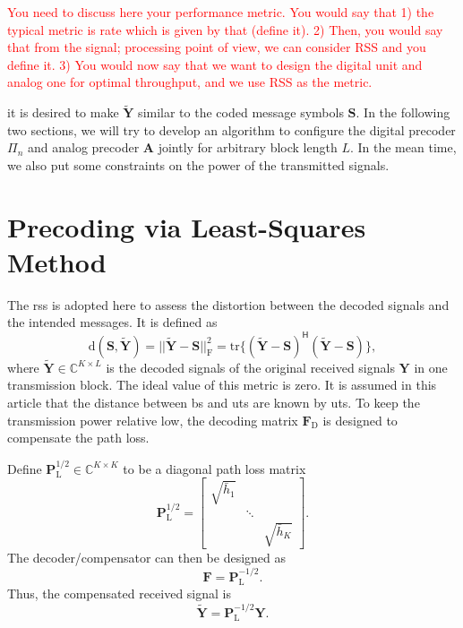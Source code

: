 \documentclass[12pt,draftclsnofoot,onecolumn,journal]{IEEEtran}
\newcommand{\cmt}[1]{\textcolor{red}{#1} }
\begin{document}
\cmt{You need to discuss here your performance metric. You would say that 1) the typical metric is rate which is given by that (define it). 2) Then, you would say that from the signal; processing point of view, we can consider RSS and you define it. 3) You would now say that we want to design the digital unit and analog one for optimal throughput, and we use RSS as the metric.}

  it is desired to make $\tilde{\mathbf Y}$ similar to the coded message symbols $\mathbf S$. In the following two sections, we will try to develop an algorithm to configure the digital precoder $\Pi_n$ and analog precoder $\mathbf A$ jointly for arbitrary block length $L$. In the mean time, we also put some constraints on the power of the transmitted signals.


\section{Precoding via Least-Squares Method}
The \ac{rss} is adopted here to assess the distortion between the decoded signals and the intended messages. It is defined as
\begin{equation}
\mathrm d(\mathbf S, \tilde{\mathbf Y})=||\tilde{\mathbf Y}-\mathbf S||_{\mathrm{F}}^2=\mathrm{tr}\{(\tilde{\mathbf Y}-\mathbf S)^{\mathsf H}(\tilde{\mathbf Y}-\mathbf S)\},
\label{eq:distancegeneral}
\end{equation}
where $\tilde{\mathbf Y}\in \mathbb C^{K\times L}$ is the decoded signals of the original received signals $\mathbf Y$ in one transmission block.
The ideal value of this metric is zero.
It is assumed in this article that the distance between \ac{bs} and \acp{ut} are known by \acp{ut}. To keep the transmission power relative low, the decoding matrix $\mathbf F_{\mathrm D}$ is designed to compensate the path loss.
 
Define $\mathbf P_{\mathrm L}^{1/2}\in \mathbb C^{K\times K}$ to be a diagonal path loss matrix
\begin{equation}
\mathbf P_{\mathrm L}^{1/2}=
\begin{bmatrix}
\sqrt{\bar h_1} & & \\
&\ddots & \\
& &\sqrt{\bar h_K}
\end{bmatrix}.
\end{equation}
The decoder/compensator can then be designed as 
\begin{equation}
\mathbf F=\mathbf P_{\mathrm L}^{-1/2}.
\end{equation}
Thus, the compensated received signal is
\begin{equation}
\tilde{\mathbf Y}=\mathbf P_{\mathrm L}^{-1/2}\mathbf Y.
\end{equation}
\end{document}
